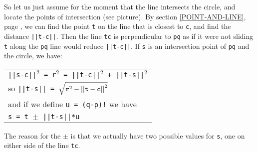\documentclass[12pt]{article}
\begin{document}
\begin{minipage}{\textwidth}\raggedright
\label{INTERSECTION-PICTURE}
\begin{wrapfigure}{r}{0.5\textwidth}
\end{wrapfigure}
So let us just assume for the moment that the line intersects
the circle, and locate the points of intersection (see picture).
By section \ref{POINT-AND-LINE}, page \pageref{POINT-AND-LINE},
we can find the point {\tt t} on the line that is closest to
{\tt c}, and find the distance {\tt ||t-c||}.  Then the line {\tt tc} is
perpendicular to {\tt pq} as if it were not sliding {\tt t}
along the {\tt pq} line would reduce {\tt ||t-c||}.
If {\tt s} is an intersection point of {\tt pq} and the circle, we have: \\
\hspace*{0.2in}\begin{tabular}{@{}l}
    {\tt ||s-c||$^2$ = r$^2$ = ||t-c||$^2$ + ||t-s||$^2$} \\
    so {\tt ||t-s|| = $\sqrt{{\tt r}^2 - {\tt ||t-c||}^2}$} \\
    and if we define {\tt u = (q-p)!} we have \\
    {\tt s = t $\pm$ ||t-s||*u} \\
    \end{tabular}
\end{minipage}

The reason for the $\pm$ is that we actually have two possible
values for {\tt s}, one on either side of the line {\tt tc}.
\end{document}
